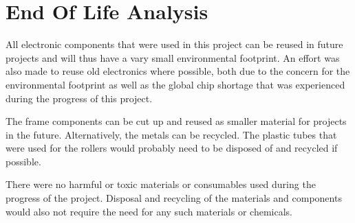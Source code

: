\newpage

\chapter{End Of Life Analysis}

All electronic components that were used in this project can be reused in future projects and will thus have a vary small environmental footprint. An effort was also made to reuse old electronics where possible, both due to the concern for the environmental footprint as well as the global chip shortage that was experienced during the progress of this project.

The frame components can be cut up and reused as smaller material for projects in the future. Alternatively, the metals can be recycled. The plastic tubes that were used for the rollers would probably need to be disposed of and recycled if possible.

There were no harmful or toxic materials or consumables used during the progress of the project. Disposal and recycling of the materials and components would also not require the need for any such materials or chemicals.
